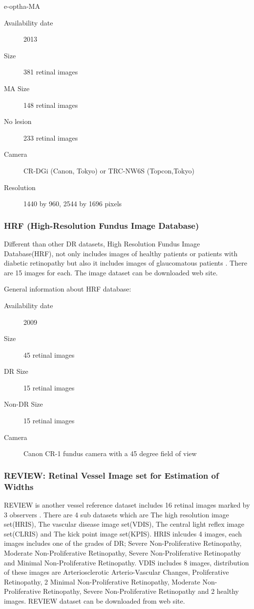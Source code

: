 e-optha-MA
\begin{description}
    \item[Availability date] 2013
    \item[Size] 381 retinal images
    \item[MA Size] 148 retinal images
    \item[No lesion] 233 retinal images
    \item[Camera] CR-DGi (Canon, Tokyo) or TRC-NW6S (Topcon,Tokyo) 
    \item[Resolution] 1440 by 960, 2544 by 1696 pixels
\end{description}


\subsubsection{HRF (High-Resolution Fundus Image Database)}
Different than other DR datasets, High Resolution Fundus Image Database(HRF), not only includes images of healthy patients or patients with diabetic retinopathy but also it includes images of glaucomatous patients \citep{budai2009multiscale}. There are 15 images for each. The image dataset can be downloaded \citet{HRF-DB} web site.


General information about HRF database:
\begin{description}
    \item[Availability date] 2009
    \item[Size] 45 retinal images
    \item[DR Size] 15 retinal images
    \item[Non-DR Size] 15 retinal images
    \item[Camera] Canon CR-1 fundus camera with a 45 degree field of view
\end{description}

\subsubsection{REVIEW: Retinal Vessel Image set for Estimation of Widths}

REVIEW is another vessel reference dataset includes 16 retinal images marked by 3 observers \citep{al2008review}. There are 4 sub datasets which are The high resolution image set(HRIS), The vascular disease image set(VDIS), The central light reflex image set(CLRIS) and The kick point image set(KPIS). 
HRIS inlcudes 4 images, each images includes one of the grades of DR; Severe Non-Proliferative Retinopathy, Moderate Non-Proliferative Retinopathy, Severe Non-Proliferative Retinopathy and Minimal Non-Proliferative Retinopathy. VDIS includes 8 images, distribution of these images are Arteriosclerotic Arterio-Vascular Changes, Proliferative Retinopathy, 2 Minimal Non-Proliferative Retinopathy, Moderate Non-Proliferative Retinopathy, Severe Non-Proliferative Retinopathy and 2 healthy images. REVIEW dataset can be downloaded from \citet{REVIEWDB} web site.

